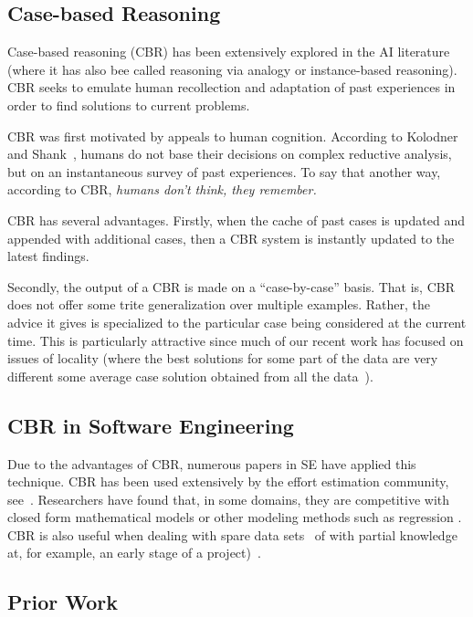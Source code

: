 \documentclass[conference]{IEEEtran}
\begin{document}
\subsection{Case-based Reasoning}
Case-based reasoning (CBR) has been extensively
explored in the AI literature
(where it has also bee called
 reasoning via analogy or instance-based reasoning).
CBR seeks to emulate human recollection and adaptation
of past experiences in order to find solutions to current
problems. 

CBR was first motivated by appeals to human cognition. According to 
Kolodner~\cite{Kolodner1992} and Shank~\cite{Schank1977},
humans do not base their decisions
on complex reductive analysis, but on an instantaneous survey of past experiences.
To say that   another way, according  to  CBR, 
{\em humans  don’t
think,  they remember.}



CBR has several advantages.
Firstly,
when the  cache of past cases is  updated and appended with additional cases, then a CBR system is instantly updated
to the latest findings.  

Secondly, the output of a CBR is made on a ``case-by-case'' basis. 
That is, CBR does not offer some trite generalization over multiple
examples. Rather, the advice it gives is specialized to the particular
case being considered at the current time.  This is particularly attractive
since much of our recent work has focused on issues
of locality (where the best solutions for some part of the data
are very different some average case solution obtained from all the data~\cite{localvsglobal}).  

\subsection{CBR in Software Engineering}
Due to the advantages of CBR, numerous papers in SE
have applied this technique.    CBR  has been used extensively by the effort estimation community, see~\cite{keung2008analogy, 6600685, walkerden1999empirical, shepperd1997estimating, kocaguneli2010use}. 
Researchers have found that, in some domains, they are competitive with  closed form mathematical models or other modeling methods such as regression \cite{keung2008analogy}. 
CBR is also useful when dealing with spare data sets~\cite{1438374} of with 
partial knowledge  at, for example,  an early stage of a project)~\cite{walkerden1999empirical}. 

\subsection{Prior Work}
\end{document}
